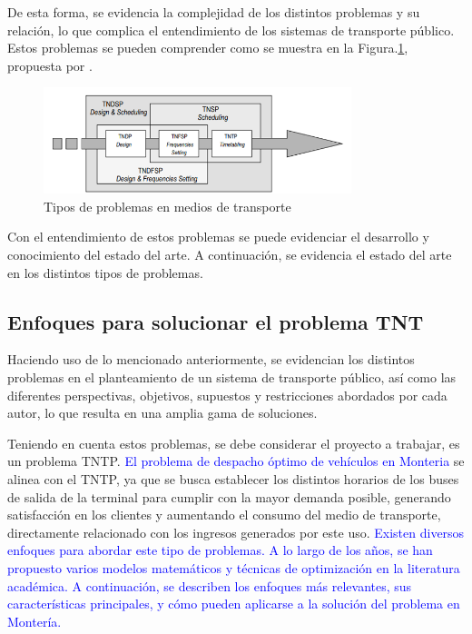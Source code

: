 \documentclass[preprint,11pt]{elsarticle}
\newcommand{\Blue}[1]{\textcolor{blue}{#1}}
\begin{document}
De esta forma, se evidencia la complejidad de los distintos problemas y su relación, lo que complica el entendimiento de los sistemas de transporte público. Estos problemas se pueden comprender como se muestra en {la Figura.\ref{fig:mi_imagen1}, propuesta por \cite{guihaire2008}}.

\captionsetup[figure]{name=Figura}
\begin{figure}[H]
  \centering
  \includegraphics[width=0.8\textwidth]{tipos.png}
  \caption{Tipos de problemas en medios de transporte}
  \label{fig:mi_imagen1}
\end{figure}


Con el entendimiento de estos problemas se puede evidenciar el desarrollo y conocimiento del estado del arte. A continuación, se evidencia el estado del arte en los distintos tipos de problemas.

\subsection{Enfoques para solucionar el problema TNT}

Haciendo uso de lo mencionado anteriormente, se evidencian los distintos problemas en el planteamiento de un sistema de transporte público, así como las diferentes perspectivas, objetivos, supuestos y restricciones abordados por cada autor, lo que resulta en una amplia gama de soluciones.

Teniendo en cuenta estos problemas, se debe considerar el proyecto a trabajar, es un problema TNTP. \Blue{El problema de despacho óptimo de vehículos en Monteria} se alinea con el TNTP, ya que se busca establecer los distintos horarios de los buses de salida de la terminal para cumplir con la mayor demanda posible, generando satisfacción en los clientes y aumentando el consumo del medio de transporte, directamente relacionado con los ingresos generados por este uso. \Blue{Existen diversos enfoques para abordar este tipo de problemas. A lo largo de los años, se han propuesto varios modelos matemáticos y técnicas de optimización en la literatura académica. A continuación, se describen los enfoques más relevantes, sus características principales, y cómo pueden aplicarse a la solución del problema en Montería.}
\end{document}
